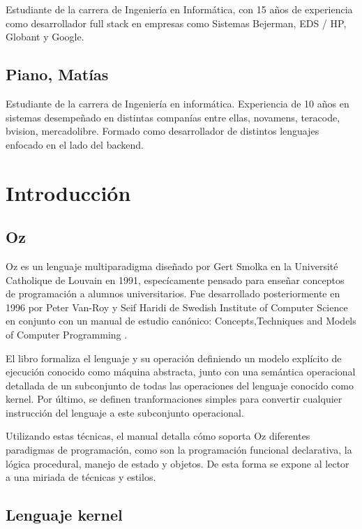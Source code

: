 \documentclass[a4paper,11pt]{article}
\begin{document}
Estudiante de la carrera de Ingeniería en Informática, con 15 años de experiencia como desarrollador full stack en empresas como Sistemas Bejerman, EDS / HP, Globant y Google.


\subsection{Piano, Matías}

Estudiante de la carrera de Ingeniería en informática. Experiencia de 10 años en sistemas desempeñado en distintas companías entre ellas, novamens, teracode, bvision, mercadolibre. Formado como desarrollador de distintos lenguajes enfocado en el lado del backend.


\section{Introducción}

\subsection{Oz}

Oz es un lenguaje multiparadigma diseñado por Gert Smolka en la Université Catholique de Louvain en 1991, especícamente pensado para enseñar conceptos de programación a alumnos universitarios. Fue desarrollado posteriormente en 1996 por Peter Van-Roy y Seif Haridi de
Swedish Institute of Computer Science en conjunto con un manual de estudio canónico: Concepts,Techniques and Models of Computer Programming \cite{ctmcp}.

El libro formaliza el lenguaje y su operación definiendo un modelo explícito de ejecución conocido como máquina abstracta, junto con una semántica operacional detallada de un subconjunto de todas las operaciones del lenguaje conocido como kernel. Por último, se definen tranformaciones simples para convertir cualquier instrucción del lenguaje a este subconjunto operacional.

Utilizando estas técnicas, el manual detalla cómo soporta Oz diferentes paradigmas de programación, como son la programación funcional declarativa, la lógica procedural, manejo de estado y objetos. De esta forma se expone al lector a una miriada de técnicas y estilos.

\subsection{Lenguaje kernel}
\end{document}
